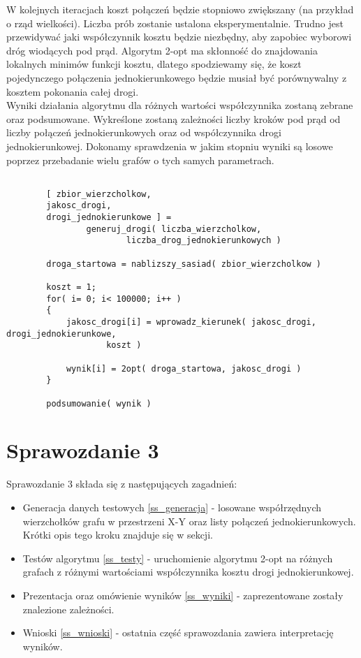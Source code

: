 \documentclass{article}
\begin{document}
W kolejnych iteracjach koszt połączeń będzie stopniowo zwiększany (na przykład o rząd wielkości). Liczba prób zostanie ustalona eksperymentalnie. Trudno jest przewidywać jaki współczynnik kosztu będzie niezbędny, aby zapobiec wyborowi dróg wiodących pod prąd. Algorytm 2-opt ma skłonność do znajdowania lokalnych minimów funkcji kosztu, dlatego spodziewamy się, że koszt pojedynczego połączenia jednokierunkowego będzie musiał być porównywalny z kosztem pokonania całej drogi. \\

Wyniki działania algorytmu dla różnych wartości współczynnika zostaną zebrane oraz podsumowane. Wykreślone zostaną zależności liczby kroków pod prąd od liczby połączeń jednokierunkowych oraz od współczynnika drogi jednokierunkowej. Dokonamy sprawdzenia w jakim stopniu wyniki są losowe poprzez przebadanie wielu grafów o tych samych parametrach. \\

\newpage
\begin{lstlisting}[caption={Funkcja testująca algorytm}]

		[ zbior_wierzcholkow, 
		jakosc_drogi, 
		drogi_jednokierunkowe ] = 
				generuj_drogi( liczba_wierzcholkow, 
						liczba_drog_jednokierunkowych )
		
		droga_startowa = nablizszy_sasiad( zbior_wierzcholkow )
		
		koszt = 1;
		for( i= 0; i< 100000; i++ )
		{
			jakosc_drogi[i] = wprowadz_kierunek( jakosc_drogi, drogi_jednokierunkowe,
					koszt )
			
			wynik[i] = 2opt( droga_startowa, jakosc_drogi )
		}
		
		podsumowanie( wynik )

\end{lstlisting}

\section{Sprawozdanie 3}

Sprawozdanie 3 składa się z następujących zagadnień: \\

\begin{itemize}

	\item Generacja danych testowych \ref{ss_generacja} - losowane współrzędnych wierzchołków grafu w przestrzeni X-Y oraz listy połączeń jednokierunkowych. Krótki opis tego kroku znajduje się w sekcji.
	\item Testów algorytmu \ref{ss_testy} - uruchomienie algorytmu 2-opt na różnych grafach z różnymi wartościami współczynnika kosztu drogi jednokierunkowej.
	\item Prezentacja oraz omówienie wyników \ref{ss_wyniki} - zaprezentowane zostały znalezione zależności.
	\item Wnioski \ref{ss_wnioski} - ostatnia część sprawozdania zawiera interpretację wyników. 
	\end{itemize}
\end{document}
